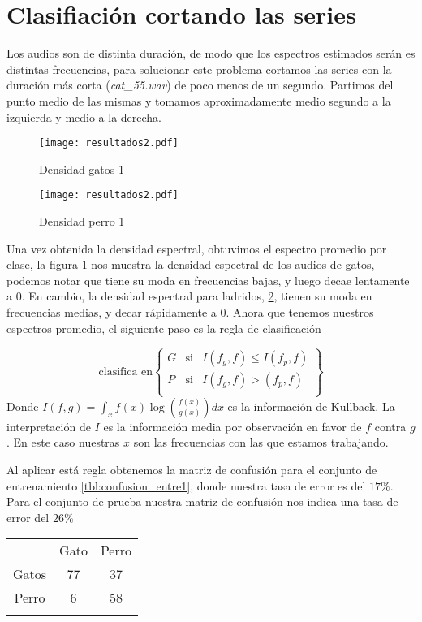 \documentclass[twocolumn,10pt]{asme2ej}
\begin{document}
\section{Clasifiaci\'on cortando las series} %
\label{sec:clasifiacion_cortando_las_series}
Los audios son de distinta duraci\'on, de modo que los espectros estimados ser\'an es distintas frecuencias, para solucionar este problema cortamos las series con la duraci\'on m\'as corta (\emph{cat\_55.wav}) de poco menos de un segundo. Partimos del punto medio de las mismas y tomamos aproximadamente medio segundo a la izquierda y medio a la derecha.
\begin{figure}[h]
  \centering
    \texttt{[image: resultados2.pdf]}
  \caption{Densidad gatos 1}
  \label{plot:dens_gato1}
\end{figure}
\begin{figure}[h]
  \centering
    \texttt{[image: resultados2.pdf]}
  \caption{Densidad perro 1}
  \label{plot:dens_perro1}
\end{figure}

Una vez obtenida la densidad espectral, obtuvimos el espectro promedio por clase, la figura \ref{plot:dens_gato1} nos muestra la densidad espectral de los audios de gatos, podemos notar que tiene su moda en frecuencias bajas, y luego decae lentamente a 0. En cambio, la densidad espectral para ladridos, \ref{plot:dens_perro1}, tienen su moda en frecuencias medias, y decar r\'apidamente a 0. Ahora que tenemos nuestros espectros promedio, el siguiente paso es la regla de clasificaci\'on

$$\text{clasifica en}\left\{
\begin{array}{ccc}
G &\text{si}&I(f_g, f)\leq I(f_p, f)\\
P &\text{si}&I(f_g, f)>(f_p, f)\\
\end{array}
\right\}$$
Donde $I(f, g)=\int_x f(x)\log(\frac{f(x)}{g(x)})dx$ es la informaci\'on de Kullback. La interpretaci\'on de $I$ es la informaci\'on media por observaci\'on en favor de $f$ contra $g$. En este caso nuestras $x$ son las frecuencias con las que estamos trabajando.

Al aplicar est\'a regla obtenemos la matriz de confusi\'on para el conjunto de entrenamiento \ref{tbl:confusion_entre1}, donde nuestra tasa de error es del $17\%$. Para el conjunto de prueba nuestra matriz de confusi\'on nos indica una tasa de error del $26\%$\\
\begin{tabular}{ccc}
 & Gato & Perro\\
 Gatos & 77& 37\\
Perro & 6 & 58\\
\label{tbl:confusion_entre1}
\end{tabular}
\end{document}

